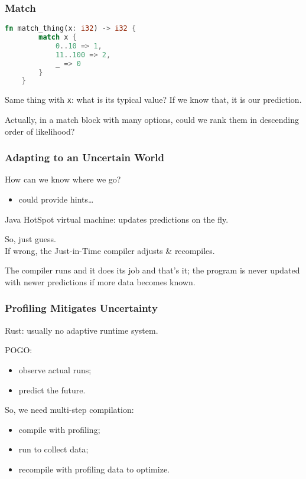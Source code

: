 \begin{frame}[fragile]
\frametitle{Match}

\begin{lstlisting}[language=Rust]
    fn match_thing(x: i32) -> i32 {
        match x {
            0..10 => 1,
            11..100 => 2,
            _ => 0
        }
    }
\end{lstlisting}

Same thing with \texttt{x}: what is its typical value? If we know that, it is our prediction. 

Actually, in a match block with many options, could we rank them in descending order of likelihood?

\end{frame}


\begin{frame}
\frametitle{Adapting to an Uncertain World}


How can we know where we go?
\begin{itemize}
\item could provide hints\ldots
\end{itemize}

Java HotSpot virtual machine: updates predictions on the fly. 

So, just guess.\\
If wrong, the Just-in-Time compiler adjusts \& recompiles.

The compiler runs and it does its job and that's it; the program is never updated with newer predictions if more data becomes known.


\end{frame}



\begin{frame}
\frametitle{Profiling Mitigates Uncertainty}



Rust: usually no adaptive runtime system.

POGO:
\begin{itemize}
\item observe actual runs;
\item predict the future.
\end{itemize}

So, we need multi-step compilation:
\begin{itemize}
\item compile with profiling;
\item run to collect data;
\item recompile with profiling data to optimize.
\end{itemize}



\end{frame}



